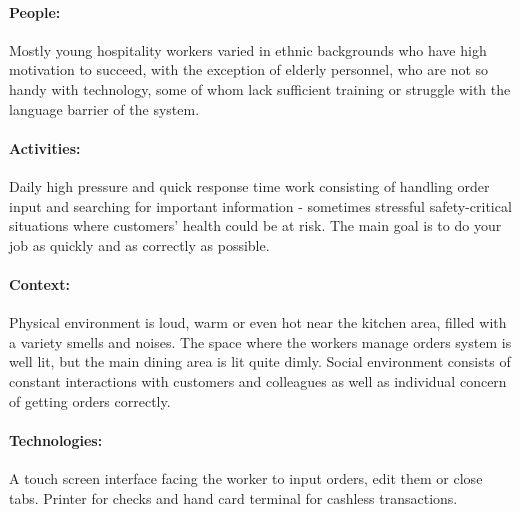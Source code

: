 \documentclass{article}
\begin{document}
\paragraph{\small People:} Mostly young hospitality workers varied in ethnic backgrounds who have high motivation to succeed, with the exception of elderly personnel, who are not so handy with technology, some of whom lack sufficient training or struggle with the language barrier of the system.
\paragraph{\small Activities:} Daily high pressure and quick response time work consisting of handling order input and searching for important information - sometimes stressful safety-critical situations where customers' health could be at risk. The main goal is to do your job as quickly and as correctly as possible.
\paragraph{\small Context:} Physical environment is loud, warm or even hot near the kitchen area, filled with a variety smells and noises. The space where the workers manage orders system is well lit, but the main dining area is lit quite dimly. Social environment consists of constant interactions with customers and colleagues as well as individual concern of getting orders correctly.
 \paragraph{\small Technologies:} A touch screen interface facing the worker to input orders, edit them or close tabs. Printer for checks and hand card terminal for cashless transactions.

\end{document}

